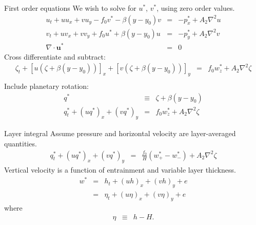 \documentclass[a4paper]{beamer}
\begin{document}
\begin{frame}{First order equations}
We wish to solve for $u^*$, $v^*$, using zero order values.
\begin{eqnarray}
u_t + uu_x + vu_y - f_0v^* - \beta(y - y_0)v & = & -p_x^* + A_2\nabla^2u\\
v_t + uv_x + vv_y + f_0u^* + \beta(y - y_0)u & = & -p_y^* + A_2\nabla^2v\\
\nabla\cdot\mathbf{u}^* & = & 0
\end{eqnarray}
Cross differentiate and subtract:
\begin{eqnarray}
\zeta_t + \left[u\left(\zeta + \beta(y - y_0)\right)\right]_x + \left[v\left(\zeta + \beta(y - y_0)\right)\right]_y  & = & f_0w_z^* + A_2\nabla^2\zeta\nonumber\\
 & &
\end{eqnarray}
Include planetary rotation:
\begin{eqnarray}
q^* & \equiv & \zeta + \beta(y - y_0)\\
q^*_t + \left(uq^*\right)_x + \left(vq^*\right)_y  & = & f_0w_z^* + A_2\nabla^2\zeta
\end{eqnarray}
\end{frame}

\begin{frame}{Layer integral}
Assume pressure and horizontal velocity are layer-averaged quantities.
\begin{eqnarray}
q^*_t + \left(uq^*\right)_x + \left(vq^*\right)_y  & = & \frac{f_0}{H}(w_+^* - w_-^*) + A_2\nabla^2\zeta
\end{eqnarray}
Vertical velocity is a function of entrainment and variable layer thickness.
\begin{eqnarray}
w^* & = &  h_t + (uh)_x + (vh)_y + e\\
    & = & \eta_t + (u\eta)_x + (v\eta)_y + e
\end{eqnarray}
where
\begin{eqnarray}
\eta & \equiv & h - H.
\end{eqnarray}
\end{frame}
\end{document}
